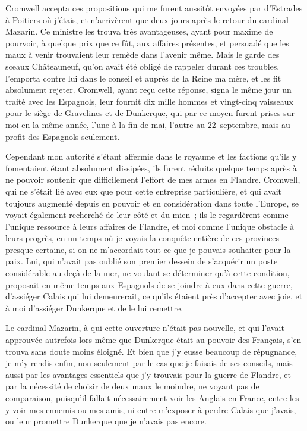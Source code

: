 \documentclass[french,twoside]{book} %
\begin{document}
Cromwell accepta ces propositions qui me furent aussitôt envoyées par d’Estrades à Poitiers où j’étais, et n’arrivèrent que deux jours après le retour du cardinal Mazarin. Ce ministre les trouva très avantageuses, ayant pour maxime de pourvoir, à quelque prix que ce fût, aux affaires présentes, et persuadé que les maux à venir trouvaient leur remède dans l’avenir même. Mais le garde des sceaux Châteauneuf, qu’on avait été obligé de rappeler durant ces troubles, l’emporta contre lui dans le conseil et auprès de la Reine ma mère, et les fit absolument rejeter. Cromwell, ayant reçu cette réponse, signa le même jour un traité avec les Espagnols, leur fournit dix mille hommes et vingt-cinq vaisseaux pour le siège de Gravelines et de Dunkerque, qui par ce moyen furent prises sur moi en la même année, l’une à la fin de mai, l’autre au 22 septembre, mais au profit des Espagnols seulement.\par
Cependant mon autorité s’étant affermie dans le royaume et les factions qu’ils y fomentaient étant absolument dissipées, ils furent réduits quelque temps après à ne pouvoir soutenir que difficilement l’effort de mes armes en Flandre. Cromwell, qui ne s’était lié avec eux que pour cette entreprise particulière, et qui avait toujours augmenté depuis en pouvoir et en considération dans toute l’Europe, se voyait également recherché de leur côté et du mien ; ils le regardèrent comme l’unique ressource à leurs affaires de Flandre, et moi comme l’unique obstacle à leurs progrès, en un temps où je voyais la conquête entière de ces provinces presque certaine, si on ne m’accordait tout ce que je pouvais souhaiter pour la paix. Lui, qui n’avait pas oublié son premier dessein de s’acquérir un poste considérable au deçà de la mer, ne voulant se déterminer qu’à cette condition, proposait en même temps aux Espagnols de se joindre à eux dans cette guerre, d’assiéger Calais qui lui demeurerait, ce qu’ils étaient près d’accepter avec joie, et à moi d’assiéger Dunkerque et de le lui remettre.\par
Le cardinal Mazarin, à qui cette ouverture n’était pas nouvelle, et qui l’avait approuvée autrefois lors même que Dunkerque était au pouvoir des Français, s’en trouva sans doute moins éloigné. Et bien que j’y eusse beaucoup de répugnance, je m’y rendis enfin, non seulement par le cas que je faisais de ses conseils, mais aussi par les avantages essentiels que j’y trouvais pour la guerre de Flandre, et par la nécessité de choisir de deux maux le moindre, ne voyant pas de comparaison, puisqu’il fallait nécessairement voir les Anglais en France, entre les y voir mes ennemis ou mes amis, ni entre m’exposer à perdre Calais que j’avais, ou leur promettre Dunkerque que je n’avais pas encore.\par
\end{document}
